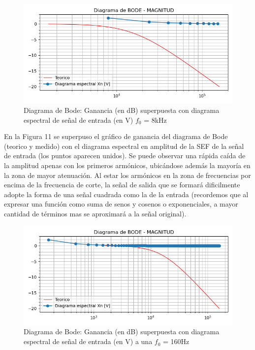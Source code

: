\begin{figure}[H]
	\centering
	\includegraphics{../Informe/Imagenes/BodeEj2.png}
	\caption{Diagrama de Bode: Ganancia (en dB) superpuesta con diagrama espectral de señal de entrada (en V) $f_0$ = 8kHz}
	\label{ej1cir}
\end{figure}

En la Figura 11 se superpuso el gráfico de ganancia del diagrama de Bode (teorico y medido) con el diagrama espectral en amplitud de la SEF de la señal de entrada (los puntos aparecen unidos). Se puede observar una rápida caída de la amplitud apenas con los primeros armónicos, ubicándose además la mayoría en la zona de mayor atenuación. Al estar los armónicos en la zona de frecuencias por encima de la frecuencia de corte, la señal de salida que se formará dificilmente adopte la forma de una señal cuadrada como la de la entrada (recordemos que al expresar una función como suma de senos y cosenos o exponenciales, a mayor cantidad de términos mas se aproximará a la señal original).

\begin{figure}[H]
	\centering
	\includegraphics{../Informe/Imagenes/Bode160Hz.png}
	\caption{Diagrama de Bode: Ganancia (en dB) superpuesta con diagrama espectral de señal de entrada (en V) a una $f_0$ = 160Hz}
	\label{ej1cir}
\end{figure}

